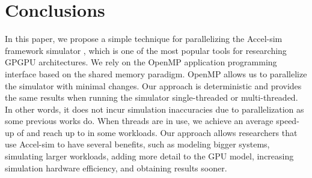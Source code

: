 \section{Conclusions} \label{sec:conclusions}

\par
In this paper, we propose a simple technique for parallelizing the Accel-sim framework simulator \cite{accelsim}, which is one of the most popular tools for researching GPGPU architectures. We rely on the OpenMP \cite{openmp} application programming interface based on the shared memory paradigm. OpenMP allows us to parallelize the simulator with minimal changes. Our approach is deterministic and provides the same results when running the simulator single-threaded or multi-threaded. In other words, it does not incur simulation inaccuracies due to parallelization as some previous works do. When \summaryNumCores{} threads are in use, we achieve an average speed-up of \summaryAvgSpeedup{} and reach up to \summaryMaxSpeedup{} in some workloads. Our approach allows researchers that use Accel-sim to have several benefits, such as modeling bigger systems, simulating larger workloads, adding more detail to the GPU model, increasing simulation hardware efficiency, and obtaining results sooner.
